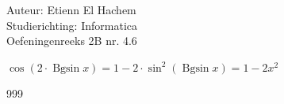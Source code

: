 \documentclass[a4paper]{article}
\DeclareMathOperator{\bgsin}{Bgsin}
\begin{document}
  
\noindent \large Auteur: Etienn El Hachem \\
\noindent \large Studierichting: Informatica\\
\noindent \large Oefeningenreeks 2B nr. 4.6\\

\medskip

\normalsize

$\cos(2\cdot\bgsin x) = 1 - 2\cdot\sin^2(\bgsin x) = 1 - 2x^2$

\begin{thebibliography}{999}
\end{thebibliography}
\end{document}
